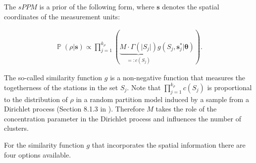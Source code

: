 \documentclass[12pt,a4paper]{article}
\DeclareMathOperator{\PP}{\mathbb{P}}
\begin{document}
The $sPPM$ is a prior of the following form, where $\mathbf{s}$ denotes the spatial coordinates of the measurement units:

\begin{align*}
    \PP(\rho | \pmb{s} ) \propto \prod_{j=1}^{k_{\rho}} \left( \underbrace{M \cdot \Gamma(\vert S_j \vert) }_{=:c(S_j)}g(S_j, \pmb{s}^*_j \vert \pmb{\theta}) \right) .
\end{align*}

The so-called similarity function $g$ is a non-negative function that measures the togetherness of the stations in the set $S_j$.
Note that $\prod_{j=1}^{k_{\rho}} c(S_j) $ is proportional to the distribution of $\rho$ in a random partition model induced by a sample from a Dirichlet process (Section 8.1.3 in \cite{lecturenotes}). Therefore $M$ takes the role of the concentration parameter in the Dirichlet process and influences the number of clusters.\medskip

For the similarity function $g$ that incorporates the spatial information there are four options available. \medskip
\end{document}

